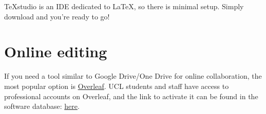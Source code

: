 TeXstudio is an IDE dedicated to \LaTeX{}, so there is minimal setup. Simply download and you're ready to go!

\section{Online editing}
If you need a tool similar to Google Drive/One Drive for online collaboration, the most popular option is \href{https://www.overleaf.com/}{Overleaf}.
UCL students and staff have access to professional accounts on Overleaf, and the link to activate it can be found in the software database: \href{https://swdb.ucl.ac.uk/package/view/id/1235}{here}.